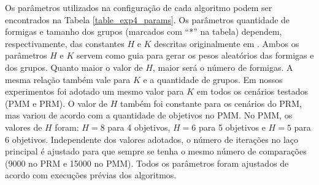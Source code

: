 Os parâmetros utilizados na configuração de cada algoritmo podem ser encontrados na Tabela \ref{table_exp4_params}. Os parâmetros quantidade de formigas e tamanho dos grupos (marcados com ``*'' na tabela) dependem, respectivamente, das constantes $H$ e $K$ descritas originalmente em \cite{Ke2013}. Ambos os parâmetros $H$ e $K$ servem como guia para gerar os pesos aleatórios das formigas e dos grupos. Quanto maior o valor de $H$, maior será o número de formigas. A mesma relação também vale para $K$ e a quantidade de grupos. Em nossos experimentos foi adotado um mesmo valor para $K$ em todos os cenários testados (PMM e PRM). O valor de $H$ também foi constante para os cenários do PRM, mas variou de acordo com a quantidade de objetivos no PMM. No PMM, os valores de $H$ foram: $H=8$ para 4 objetivos, $H=6$ para 5 objetivos e $H=5$ para 6 objetivos. Independente dos valores adotados, o número de iterações no laço principal é ajustado para que sempre se tenha o mesmo número de comparações (9000 no PRM e 15000 no PMM). Todos os parâmetros foram ajustados de acordo com execuções prévias dos algoritmos. 

